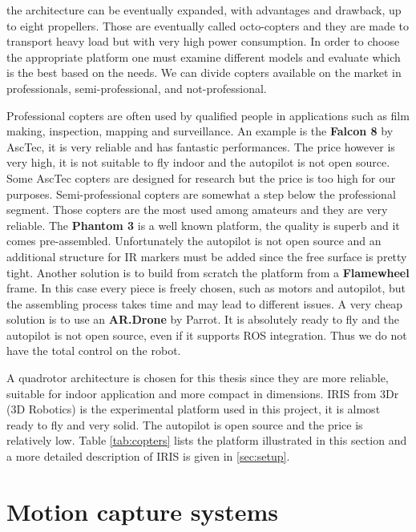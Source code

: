 the architecture can be eventually expanded, with advantages and drawback, up to eight propellers. Those are eventually called octo-copters and they are made to transport heavy load but with very high power consumption. In order to choose the appropriate platform one must examine different models and evaluate which is the best based on the needs. We can divide copters available on the market in professionals, semi-professional, and not-professional.\par Professional copters are often used by qualified people in applications such as film making, inspection, mapping and surveillance. An example is the\textbf{ Falcon 8} by AscTec, it is very reliable and has fantastic performances. The price however is very high, it is not suitable to fly indoor and the autopilot is not open source. Some AscTec copters are designed for research but the price is too high for our purposes. Semi-professional copters are somewhat a step below the professional segment. Those copters are the most used among amateurs and they are very reliable. The \textbf{Phantom 3} is a well known platform, the quality is superb and it comes pre-assembled. Unfortunately the autopilot is not open source and an additional structure for IR markers must be added since the free surface is pretty tight. Another solution is to build from scratch the platform from a \textbf{Flamewheel} frame. In this case every piece is freely chosen, such as motors and autopilot, but the assembling process takes time and may lead to different issues. A very cheap solution is to use an \textbf{AR.Drone} by Parrot. It is absolutely ready to fly and the autopilot is not open source, even if it supports ROS integration. Thus we do not have the total control on the robot.
\par A quadrotor architecture is chosen for this thesis since they are more reliable, suitable for indoor application and more compact in  dimensions. IRIS from 3Dr (3D Robotics) is the experimental platform used in this project, it is almost ready to fly and very solid. The autopilot is open source and the price is relatively low. Table \ref{tab:copters} lists the platform illustrated in this section and a more detailed description of IRIS is given in \ref{sec:setup}.

\section{Motion capture systems}

